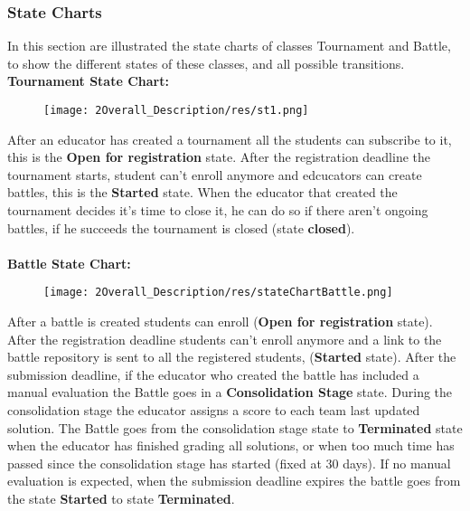\subsubsection{State Charts}
In this section are illustrated the state charts of classes Tournament and Battle, to show the different states of these classes, and all possible transitions.\\

\textbf{Tournament State Chart:}
\begin{figure}[h]
    \centering
    \texttt{[image: 2Overall\_Description/res/st1.png]}
\end{figure}

After an educator has created a tournament all the students can subscribe to it, this is the \textbf{Open for registration} state. After the registration deadline the tournament starts, student can't enroll anymore and edcucators can create battles, this is the \textbf{Started} state. When the educator that created the tournament decides it's time to close it, he can do so if there aren't ongoing battles, if he succeeds the tournament is closed (state \textbf{closed}).\\
\\
\clearpage
\textbf{Battle State Chart:}
\begin{figure}[h]
    \centering
    \texttt{[image: 2Overall\_Description/res/stateChartBattle.png]}
\end{figure}

After a battle is created students can enroll (\textbf{Open for registration} state). After the registration deadline students can't enroll anymore and a link to the battle repository is sent to all the registered students, (\textbf{Started} state). After the submission deadline, if the educator who created the battle has included a manual evaluation the Battle goes in a \textbf{Consolidation Stage} state. During the consolidation stage the educator assigns a score to each team last updated solution. The Battle goes from the consolidation stage state to \textbf{Terminated} state when the educator has finished grading all solutions, or when too much time has passed since the consolidation stage has started (fixed at 30 days). If no manual evaluation is expected, when the submission deadline expires the battle goes from the state \textbf{Started} to state \textbf{Terminated}.
